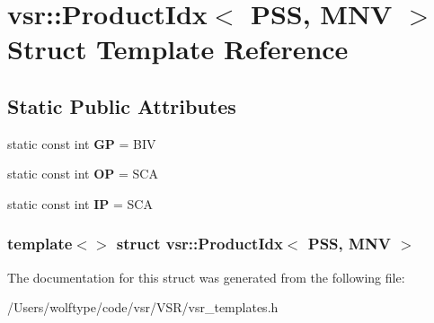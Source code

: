 \hypertarget{structvsr_1_1_product_idx_3_01_p_s_s_00_01_m_n_v_01_4}{\section{vsr\-:\-:Product\-Idx$<$ P\-S\-S, M\-N\-V $>$ Struct Template Reference}
\label{structvsr_1_1_product_idx_3_01_p_s_s_00_01_m_n_v_01_4}
}
\subsection*{Static Public Attributes}
\begin{DoxyCompactItemize}
\item 
\hypertarget{structvsr_1_1_product_idx_3_01_p_s_s_00_01_m_n_v_01_4_abd80495e0507848ed1a3e26c94a34e3e}{static const int {\bfseries G\-P} = B\-I\-V}\label{structvsr_1_1_product_idx_3_01_p_s_s_00_01_m_n_v_01_4_abd80495e0507848ed1a3e26c94a34e3e}

\item 
\hypertarget{structvsr_1_1_product_idx_3_01_p_s_s_00_01_m_n_v_01_4_aa98bc17c45167a3b2f9d9cd56e5455d5}{static const int {\bfseries O\-P} = S\-C\-A}\label{structvsr_1_1_product_idx_3_01_p_s_s_00_01_m_n_v_01_4_aa98bc17c45167a3b2f9d9cd56e5455d5}

\item 
\hypertarget{structvsr_1_1_product_idx_3_01_p_s_s_00_01_m_n_v_01_4_a3b54f61dad5f1b4462998229fbd0e4bb}{static const int {\bfseries I\-P} = S\-C\-A}\label{structvsr_1_1_product_idx_3_01_p_s_s_00_01_m_n_v_01_4_a3b54f61dad5f1b4462998229fbd0e4bb}

\end{DoxyCompactItemize}
\subsubsection*{template$<$$>$ struct vsr\-::\-Product\-Idx$<$ P\-S\-S, M\-N\-V $>$}



The documentation for this struct was generated from the following file\-:\begin{DoxyCompactItemize}
\item 
/\-Users/wolftype/code/vsr/\-V\-S\-R/vsr\-\_\-templates.\-h\end{DoxyCompactItemize}
